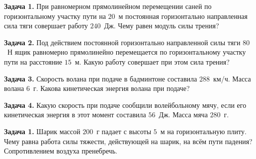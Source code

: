 
\begin{taskbasic}[code={\label{task:work_v1_n3}}]
\textbf{Задача 1.} При равномерном прямолинейном перемещении саней по горизонтальному участку пути на $20$~м постоянная горизонтально направленная сила тяги совершает работу $240$~Дж. Чему равен модуль силы трения?

\end{taskbasic}

\begin{taskbasic}[code={\label{task:work_v2_n3}}]
\textbf{Задача 2.} Под действием постоянной горизонтально направленной силы тяги $80$~Н ящик равномерно прямолинейно перемещается по горизонтальному участку пути на расстояние $15$~м. Какую работу совершает при этом сила трения?

\end{taskbasic}

\begin{taskbasic}[code={\label{task:work_v5_n3}}]
\textbf{Задача 3.} Скорость волана при подаче в бадминтоне составила $288$~км/ч. Масса волана $6$~г. Какова кинетическая энергия волана при подаче?

\end{taskbasic}

\begin{taskbasic}[code={\label{task:work_v6_n3}}]
\textbf{Задача 4.} Какую скорость при подаче сообщили волейбольному мячу, если его кинетическая энергия в этот момент составила $56$~Дж. Масса мяча $280$~г.

\end{taskbasic}


\begin{taskbasic}[code={\label{task:work_v11_n3}}]
\textbf{Задача 1.} Шарик массой $200$~г падает с высоты $5$~м на горизонтальную плиту. Чему равна работа силы тяжести, действующей на шарик, на всём пути падения? Сопротивлением воздуха пренебречь.

\end{taskbasic}

